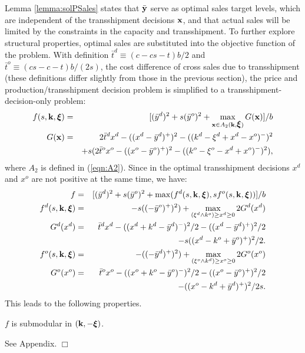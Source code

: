 \documentclass[mnsc,nonblindrev,copyedit]{informs2_wz} %
\newcommand{\proof}{\noindent{\bf Proof: } }
\newcommand{\qed}{ \hfill $\Box$ }
\newcommand{\xiv}{\mbox{\boldmath$\xi$}}
\begin{document}
Lemma \ref{lemma:solPSales} states that $\bar{\bold y}$ serve as optimal sales target levels, which are independent of the transshipment decisions $\bold x$, and that actual sales will be limited by the constraints in the capacity and transshipment.  To further explore structural properties, optimal sales are substituted into the objective function of the problem.  With definition $\bar{t}^d \equiv (c-cs-t)b/2$ and $\bar{t}^o \equiv (cs-c-t)b/(2s)$, the cost difference of cross sales due to transshipment (these definitions differ slightly from those in the previous section), the price and production/transshipment decision problem is simplified to a transshipment-decision-only problem:
\begin{eqnarray}
f(s,\bold{k},\xiv) &=& [(\bar{y}^d)^2 + s(\bar{y}^o)^2 +
\max_{\bold {x} \in
A_2(\bold k, \xiv)} G(\bold x)]/b \label{eqn:fPNewTran}\\
G(\bold x) &=& 2\bar{t}^d x^d - ((x^d - \bar{y}^d)^+)^2 - ((k^d
-\xi^d +x^d-x^o)^-)^2 \label{eqn:GNew} \\ &&+ s(2\bar{t}^ox^o-
((x^o - \bar{y}^o)^+)^2-((k^o-\xi^o -x^d+x^o)^-)^2), \nonumber
\end{eqnarray}
where $A_2$ is defined in (\ref{eqn:A2}).  Since in the optimal transshipment decisions $x^d$ and $x^o$ are not positive at the same time, we have:
\begin{eqnarray}
f &=& [(\bar{y}^d)^2 + s(\bar{y}^o)^2 + \max(f^d(s,\bold k, \xiv),
sf^o(s,\bold k, \xiv))]/b\\
f^d(s,\bold k,\xiv)& =& -s((-\bar{y}^o)^+)^2) +\max_{(\xi^d\wedge
k^o) \geq x^d \geq 0} 2G^d( x^d ) \label{eqn:fd} \\G^d(x^d) &=&
\bar{t}^d x^d - ((x^d+k^d -\bar{y}^d )^-)^2/2 - ((x^d -
\bar{y}^d)^+)^2/2 \nonumber \\&&- s((x^d-k^o+\bar{y}^o)^+)^2/2.
\label{eqn:Gd}
\\f^o(s,\bold k,\xiv)& =& -((-\bar{y}^d)^+)^2) +\max_{(\xi^o\wedge
k^d) \geq x^o \geq 0} 2G^o( x^o ) \label{eqn:fo} \\G^o(x^o) &=&
\bar{t}^o x^o - ((x^o+k^o-\bar{y}^o )^-)^2/2 - ((x^o -
\bar{y}^o)^+)^2/2 \nonumber \\&&- ((x^o-k^d
+\bar{y}^d)^+)^2/2s.\label{eqn:Go}
\end{eqnarray}
This leads to the following properties.


{\lemma $f$ is submodular in $(\bold k, -\xiv)$.
\label{lemma:priceFsub}}

\proof See Appendix. \qed
\end{document}

